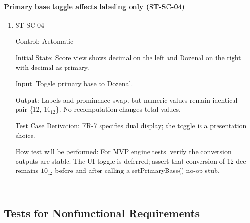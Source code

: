 \documentclass[12pt, titlepage]{article}
\begin{document}
\paragraph{Primary base toggle affects labeling only (ST-SC-04)}

\begin{enumerate}
\item{ST-SC-04\\}

Control: Automatic
					
Initial State: Score view shows decimal on the left and Dozenal on the right with decimal as primary.
					
Input: Toggle primary base to Dozenal.
					
Output: Labels and prominence swap, but numeric values remain identical pair \{12, 10$_{12}$\}. No recomputation changes total values.

Test Case Derivation: FR-7 specifies dual display; the toggle is a presentation choice.

How test will be performed: For MVP engine tests, verify the conversion outputs are stable. The UI toggle is deferred; assert that conversion of 12 dec remains $10_{12}$ before and after calling a setPrimaryBase() no-op stub.
\end{enumerate}



...

\subsection{Tests for Nonfunctional Requirements}



\end{document}
